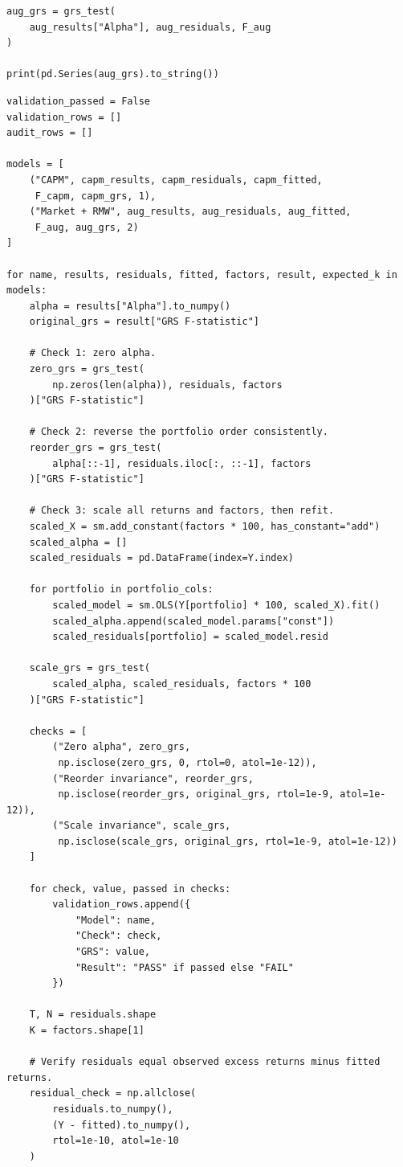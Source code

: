 \documentclass[11pt]{article}
\begin{document}
\begin{lstlisting}
aug_grs = grs_test(
    aug_results["Alpha"], aug_residuals, F_aug
)

print(pd.Series(aug_grs).to_string())
\end{lstlisting}
\begin{lstlisting}
validation_passed = False
validation_rows = []
audit_rows = []

models = [
    ("CAPM", capm_results, capm_residuals, capm_fitted,
     F_capm, capm_grs, 1),
    ("Market + RMW", aug_results, aug_residuals, aug_fitted,
     F_aug, aug_grs, 2)
]

for name, results, residuals, fitted, factors, result, expected_k in models:
    alpha = results["Alpha"].to_numpy()
    original_grs = result["GRS F-statistic"]

    # Check 1: zero alpha.
    zero_grs = grs_test(
        np.zeros(len(alpha)), residuals, factors
    )["GRS F-statistic"]

    # Check 2: reverse the portfolio order consistently.
    reorder_grs = grs_test(
        alpha[::-1], residuals.iloc[:, ::-1], factors
    )["GRS F-statistic"]

    # Check 3: scale all returns and factors, then refit.
    scaled_X = sm.add_constant(factors * 100, has_constant="add")
    scaled_alpha = []
    scaled_residuals = pd.DataFrame(index=Y.index)

    for portfolio in portfolio_cols:
        scaled_model = sm.OLS(Y[portfolio] * 100, scaled_X).fit()
        scaled_alpha.append(scaled_model.params["const"])
        scaled_residuals[portfolio] = scaled_model.resid

    scale_grs = grs_test(
        scaled_alpha, scaled_residuals, factors * 100
    )["GRS F-statistic"]

    checks = [
        ("Zero alpha", zero_grs,
         np.isclose(zero_grs, 0, rtol=0, atol=1e-12)),
        ("Reorder invariance", reorder_grs,
         np.isclose(reorder_grs, original_grs, rtol=1e-9, atol=1e-12)),
        ("Scale invariance", scale_grs,
         np.isclose(scale_grs, original_grs, rtol=1e-9, atol=1e-12))
    ]

    for check, value, passed in checks:
        validation_rows.append({
            "Model": name,
            "Check": check,
            "GRS": value,
            "Result": "PASS" if passed else "FAIL"
        })

    T, N = residuals.shape
    K = factors.shape[1]

    # Verify residuals equal observed excess returns minus fitted returns.
    residual_check = np.allclose(
        residuals.to_numpy(),
        (Y - fitted).to_numpy(),
        rtol=1e-10, atol=1e-10
    )


\end{lstlisting}
\end{document}
